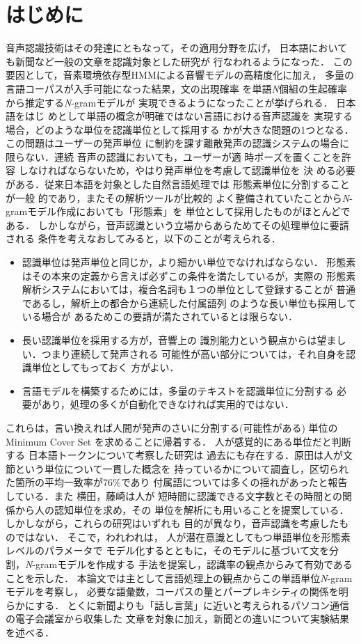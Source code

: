 \section{はじめに}
  音声認識技術はその発達にともなって，その適用分野を広げ，
日本語においても新聞など一般の文章を認識対象とした研究が
行なわれるようになった\cite{MATSUOKA,NISIMURA4}．
この要因として，音素環境依存型HMMによる音響モデルの高精度化に加え，
多量の言語コーパスが入手可能になった結果，文の出現確率
を単語{\it N}個組の生起確率から推定する{\it N}-gramモデルが
実現できるようになったことが挙げられる．
  日本語をはじ\break
めとして単語の概念が明確ではない言語における音声認識を
実現する場合，どのような単位を認識単位として採用する
かが大きな問題の1つとなる．この問題はユーザーの発声単位
に制約を課す離散発声の認識システムの場合に限らない．連続
音声の認識においても，ユーザーが適\break
時ポーズを置くことを許容
しなければならないため，やはり発声単位を考慮して認識単位を
決\break
める必要がある．従来日本語を対象とした自然言語処理では
形態素単位に分割することが一般\break
的であり，またその解析ツールが比較的
\mbox{よく整備されていたことから{\it N}-gramモデル作成におい}ても「形態素」を
単位として採用したものがほとんどである\cite{MATSUOKA,ITOHK}．
しかしながら，音声認識という立場からあらためてその処理単位に要請される
条件を考えなおしてみると，以下のことが考えられる．
\begin{itemize}
  \item 認識単位は発声単位と同じか，より細かい単位でなければならない．
形態素はその本来の定義から言えば必ずこの条件を満たしているが，実際の
形態素解析システムにおいては，複合名詞も１つの単位として登録することが
普通であるし，解析上の都合から連続した付属語列
のような長い単位も採用している場合が
あるためこの要請が満たされているとは限らない．
  \item 長い認識単位を採用する方が，音響上の
識別能力という観点からは望ましい．つまり連続して発声される
可能性が高い部分については，それ自身を認識単位としてもっておく
方がよい．
  \item 言語モデルを構築するためには，多量のテキストを認識単位に分割する
必要があり，処理の多くが自動化できなければ実用的ではない．
\end{itemize}
  これらは，言い換えれば人間が発声のさいに分割する(可能性がある)
単位のMinimum Cover Set
を求めることに帰着する．
人が感覚的にある単位だと判断する
\mbox{日本語トークンについて考}察した研究は
過去にも存在する．原田\cite{HARADA}は人が文節という単位について一貫した概念を
持っているかについて調査し，区切られた箇所の平均一致率が76\%であり
付属語については多くの揺れがあったと報告している．また
横田，藤崎\cite{YOKOTA}は人が
短時間に認識できる文字数とその時間との関係から人の認知単位を求め，その
単位を解析にも用いることを提案している．しかしながら，これらの研究はいずれも
目的が異なり，音声認識を考慮したものではない．
そこで，われわれは，
人が潜在意識としてもつ単語単位を形態素レベルのパラメータで
モデル化するとともに，そのモデルに基づいて文を分割，{\it N}-gramモデルを作成する
手法を提案し，認識率の観点からみて有効であることを示した\cite{NISIMURA3}．
本論文では主として言語処理上の観点からこの単語単位{\it N}-gramモデルを考察し，
必要な語彙数，コーパスの量とパープレキシティの関係を明らかにする．
とくに新聞よりも「話し言葉」に近いと考えられるパソコン通信の電子会議室から収集した
文章を対象に加え，新聞との違いについて実験結果を述べる．
